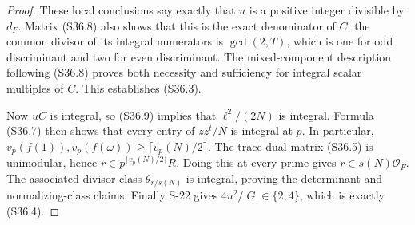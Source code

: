 \begin{proof}
These local conclusions say exactly that $u$ is a
positive integer divisible by $d_F$. Matrix (S36.8)
also shows that this is the exact denominator of $C$:
the common divisor of its integral numerators is
$\gcd(2,T)$, which is one for odd discriminant and two
for even discriminant. The mixed-component description
following (S36.8) proves both necessity and sufficiency
for integral scalar multiples of $C$. This establishes
(S36.3).

Now $uC$ is integral, so (S36.9) implies that
$\ell^2/(2N)$ is integral. Formula (S36.7) then shows
that every entry of $zz^t/N$ is integral at $p$.
In particular,
$v_p(f(1)),v_p(f(\omega))\ge\lceil v_p(N)/2\rceil$.
The trace-dual matrix (S36.5) is unimodular, hence
$r\in p^{\lceil v_p(N)/2\rceil}R$.
Doing this at every prime gives $r\in s(N)\mathcal O_F$.
The associated divisor class $\theta_{r/s(N)}$ is
integral, proving the determinant and normalizing-class
claims. Finally S-22 gives $4u^2/|G|\in\{2,4\}$,
which is exactly (S36.4).
\end{proof}
